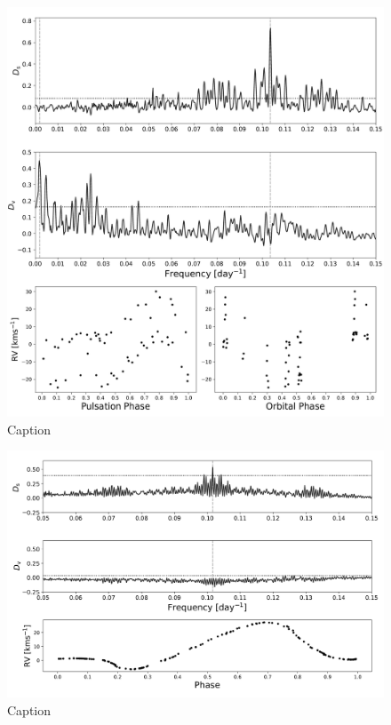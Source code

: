         \begin{figure}[H]
        \centering
        \includegraphics[width=\textwidth]{report/images/chap2_foundations/Smus.png}
        \caption{Caption}
        \label{2.5c}
        \end{figure}

        \begin{figure}[H]
        \centering
        \includegraphics[width=\textwidth]{report/images/chap2_foundations/betador.png}
        \caption{Caption}
        \label{2.5d}
        \end{figure}